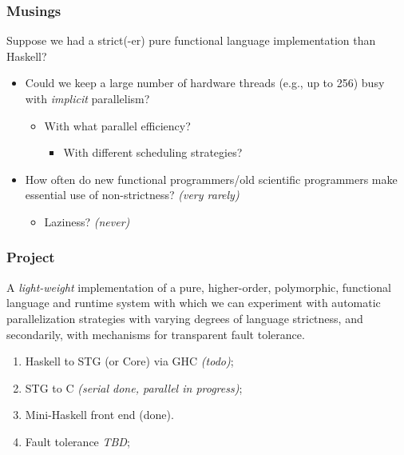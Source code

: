 \documentclass{beamer}
\begin{document}
\begin{frame}
  \frametitle{Musings}
  Suppose we had a strict(-er) pure functional language implementation than Haskell?
  \begin{itemize}
  \item<1-> Could we keep a large number of hardware threads (e.g., up to 256) busy with
    \emph{implicit} parallelism?
    \begin{itemize}
    \item With what parallel efficiency?
      \begin{itemize}
      \item With different scheduling strategies?
      \end{itemize}
    \end{itemize}
  \item<2-> How often do new functional programmers/old scientific programmers
    make essential use of non-strictness?  \emph{(very rarely)}
    \begin{itemize}
    \item Laziness? \emph{(never)}
    \end{itemize}
  \end{itemize}
\end{frame}


\begin{frame}
\frametitle{Project} 
A \emph{light-weight} implementation of a pure, higher-order, polymorphic,
functional language and runtime system with which we can experiment with
automatic parallelization strategies with varying degrees of language
strictness, and secondarily, with mechanisms for transparent fault tolerance.
\begin{enumerate}
\item<2-> Haskell to STG (or Core) via GHC \emph{(todo)};
  \\
\item<3-> STG to C \emph{(serial done, parallel in progress)};
  \\
\item<4-> Mini-Haskell front end (done).
  \\
\item<5-> Fault tolerance \emph{TBD};
\end{enumerate}
\end{frame}
\end{document}
